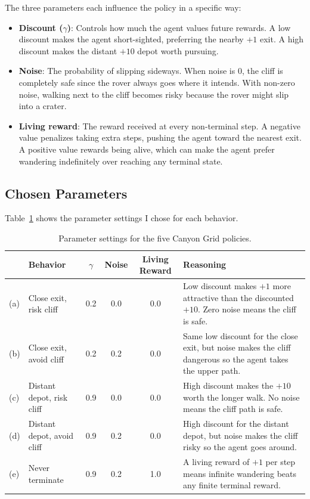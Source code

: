 \documentclass[11pt,a4paper]{article}
\begin{document}
The three parameters each influence the policy in a specific way:

\begin{itemize}[leftmargin=2em]
    \item \textbf{Discount ($\gamma$)}: Controls how much the agent values future rewards. A low discount makes the agent short-sighted, preferring the nearby $+1$ exit. A high discount makes the distant $+10$ depot worth pursuing.

    \item \textbf{Noise}: The probability of slipping sideways. When noise is 0, the cliff is completely safe since the rover always goes where it intends. With non-zero noise, walking next to the cliff becomes risky because the rover might slip into a crater.

    \item \textbf{Living reward}: The reward received at every non-terminal step. A negative value penalizes taking extra steps, pushing the agent toward the nearest exit. A positive value rewards being alive, which can make the agent prefer wandering indefinitely over reaching any terminal state.
\end{itemize}

\subsection{Chosen Parameters}

Table~\ref{tab:q2} shows the parameter settings I chose for each behavior.

\begin{table}[h]
\centering
\begin{tabular}{@{}llcccp{5.5cm}@{}}
\toprule
& Behavior & $\gamma$ & Noise & Living Reward & Reasoning \\
\midrule
(a) & Close exit, risk cliff & 0.2 & 0.0 & 0.0 & Low discount makes $+1$ more attractive than the discounted $+10$. Zero noise means the cliff is safe. \\
(b) & Close exit, avoid cliff & 0.2 & 0.2 & 0.0 & Same low discount for the close exit, but noise makes the cliff dangerous so the agent takes the upper path. \\
(c) & Distant depot, risk cliff & 0.9 & 0.0 & 0.0 & High discount makes the $+10$ worth the longer walk. No noise means the cliff path is safe. \\
(d) & Distant depot, avoid cliff & 0.9 & 0.2 & 0.0 & High discount for the distant depot, but noise makes the cliff risky so the agent goes around. \\
(e) & Never terminate & 0.9 & 0.2 & 1.0 & A living reward of $+1$ per step means infinite wandering beats any finite terminal reward. \\
\bottomrule
\end{tabular}
\caption{Parameter settings for the five Canyon Grid policies.}
\label{tab:q2}
\end{table}
\end{document}
